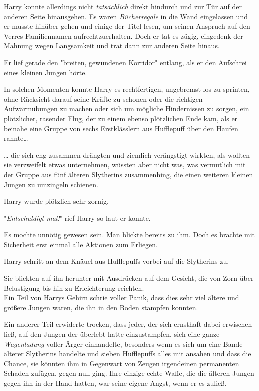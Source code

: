 {Harry konnte allerdings nicht \emph{tatsächlich} direkt hindurch und zur Tür auf der anderen Seite hinausgehen. Es waren \emph{Bücherregale} in die Wand eingelassen und er musste hinüber gehen und einige der Titel lesen, um seinen Anspruch auf den Verres-Familiennamen aufrechtzuerhalten. Doch er tat es zügig, eingedenk der Mahnung wegen Langsamkeit und trat dann zur anderen Seite hinaus.

Er lief gerade den "breiten, gewundenen Korridor" entlang, als er den Aufschrei eines kleinen Jungen hörte.

In solchen Momenten konnte Harry es rechtfertigen, ungebremst los zu sprinten, ohne Rücksicht darauf seine Kräfte zu schonen oder die richtigen Aufwärmübungen zu machen oder sich um mögliche Hindernissen zu sorgen, ein plötzlicher, rasender Flug, der zu einem ebenso plötzlichen Ende kam, als er beinahe eine Gruppe von sechs Erstklässlern aus Hufflepuff über den Haufen rannte…

… die sich eng zusammen drängten und ziemlich verängstigt wirkten, als wollten sie verzweifelt etwas unternehmen, wüssten aber nicht was, was vermutlich mit der Gruppe aus fünf älteren Slytherins zusammenhing, die einen weiteren kleinen Jungen zu umzingeln schienen.

Harry wurde plötzlich sehr zornig.

"\emph{Entschuldigt mal!}" rief Harry so laut er konnte.

Es mochte unnötig gewesen sein. Man blickte bereits zu ihm. Doch es brachte mit Sicherheit erst einmal alle Aktionen zum Erliegen.

Harry schritt an dem Knäuel aus Hufflepuffs vorbei auf die Slytherins zu.

Sie blickten auf ihn herunter mit Ausdrücken auf dem Gesicht, die von Zorn über Belustigung bis hin zu Erleichterung reichten.\\ Ein Teil von Harrys Gehirn schrie voller Panik, dass dies sehr viel ältere und größere Jungen waren, die ihn in den Boden stampfen konnten.

Ein anderer Teil erwiderte trocken, dass jeder, der sich ernsthaft dabei erwischen ließ, auf den Jungen-der-überlebt-hatte einzustampfen, sich eine ganze \emph{Wagenladung} voller Ärger einhandelte, besonders wenn es sich um eine Bande älterer Slytherins handelte und sieben Hufflepuffs alles mit ansahen und dass die Chance, sie könnten ihm in Gegenwart von Zeugen irgendeinen permanenten Schaden zufügen, gegen null ging. Ihre einzige echte Waffe, die die älteren Jungen gegen ihn in der Hand hatten, war seine eigene Angst, wenn er es zuließ.

}
